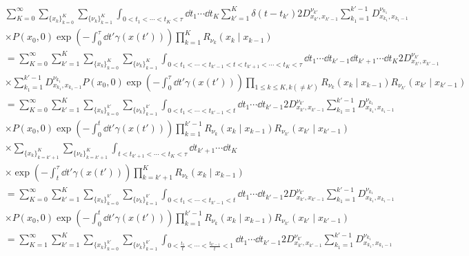 \documentclass{ltjsarticle}
\begin{document}
\begin{align}
  &\sum_{K=0}^{\infty}\sum_{\lbrace x_k\rbrace_{k=0}^K}\sum_{\lbrace\nu_k\rbrace_{k=1}^K}\int_{0<t_1<\cdots<t_K<\tau}\dd{t_1}\cdots \dd{t_K}\sum_{k'=1}^{K}\delta(t-t_{k'})2D^{\nu_{k'}}_{x_{k'},x_{k'-1}}\sum_{k_1=1}^{k'-1}D^{\nu_{k_1}}_{x_{k_1},x_{k_1-1}}\\
  &\times P(x_0,0)\exp\left(-\int_0^\tau \dd{t'}\gamma\left(x(t')\right)\right)\prod_{k=1}^K R_{\nu_k}\left(x_k\mid x_{k-1}\right)\\
  &=\sum_{K=0}^{\infty}\sum_{k'=1}^K\sum_{\lbrace x_k\rbrace_{k=0}^K}\sum_{\lbrace\nu_k\rbrace_{k=1}^K}\int_{0<t_1<\cdots<t_{k'-1}<t<t_{k'+1}<\cdots<t_K<\tau}\dd{t_1}\cdots\dd{t_{k'-1}}\dd{t_{k'+1}}\cdots \dd{t_K}2D^{\nu_{k'}}_{x_{k'},x_{k'-1}}\\
  &\times \sum_{k_1=1}^{k'-1}D^{\nu_{k_1}}_{x_{k_1},x_{k_1-1}}P(x_0,0)\exp\left(-\int_0^\tau \dd{t'}\gamma\left(x(t')\right)\right)\prod_{1\le k\le K,k(\neq k')} R_{\nu_{k}}\left(x_{k}\mid x_{k-1}\right)R_{\nu_{k'}}\left(x_{k'}\mid x_{k'-1}\right)\\
  &=\sum_{K=0}^{\infty}\sum_{k'=1}^K\sum_{\lbrace x_k\rbrace_{k=0}^{k'}}\sum_{\lbrace\nu_k\rbrace_{k=1}^{k'}}\int_{0<t_1<\cdots<t_{k'-1}<t}\dd{t_1}\cdots\dd{t_{k'-1}}2D^{\nu_{k'}}_{x_{k'},x_{k'-1}}\sum_{k_1=1}^{k'-1}D^{\nu_{k_1}}_{x_{k_1},x_{k_1-1}} \\
  &\times P(x_0,0)\exp\left(-\int_0^{t} \dd{t'}\gamma\left(x(t')\right)\right)\prod_{k=1}^{k'-1} R_{\nu_k}\left(x_k\mid x_{k-1}\right)R_{\nu_{k'}}\left(x_{k'}\mid x_{k'-1}\right)\\
  &\times\sum_{\lbrace x_k\rbrace_{k=k'+1}^{K}}\sum_{\lbrace\nu_k\rbrace_{k=k'+1}^{K}}\int_{t<t_{k'+1}<\cdots<t_K<\tau}\dd{t_{k'+1}}\cdots \dd{t_K}\\
  &\times\exp\left(-\int_t^\tau \dd{t'}\gamma\left(x(t')\right)\right)\prod_{k=k'+1}^K R_{\nu_k}\left(x_k\mid x_{k-1}\right)\\
  &=\sum_{K=0}^{\infty}\sum_{k'=1}^K\sum_{\lbrace x_k\rbrace_{k=0}^{k'}}\sum_{\lbrace\nu_k\rbrace_{k=1}^{k'}}\int_{0<t_1<\cdots<t_{k'-1}<t}\dd{t_1}\cdots\dd{t_{k'-1}}2D^{\nu_{k'}}_{x_{k'},x_{k'-1}}\sum_{k_1=1}^{k'-1}D^{\nu_{k_1}}_{x_{k_1},x_{k_1-1}} \\
  &\times P(x_0,0)\exp\left(-\int_0^{t} \dd{t'}\gamma\left(x(t')\right)\right)\prod_{k=1}^{k'-1} R_{\nu_k}\left(x_k\mid x_{k-1}\right)R_{\nu_{k'}}\left(x_{k'}\mid x_{k'-1}\right)\\
  &=\sum_{K=1}^{\infty}\sum_{k'=1}^K\sum_{\lbrace x_k\rbrace_{k=0}^{k'}}\sum_{\lbrace\nu_k\rbrace_{k=1}^{k'}}\int_{0<\frac{t_1}{t}<\cdots<\frac{t_{k'-1}}{t}<1}\dd{t_1}\cdots\dd{t_{k'-1}}2D^{\nu_{k'}}_{x_{k'},x_{k'-1}}\sum_{k_1=1}^{k'-1}D^{\nu_{k_1}}_{x_{k_1},x_{k_1-1}} \\

\end{align}
\end{document}
